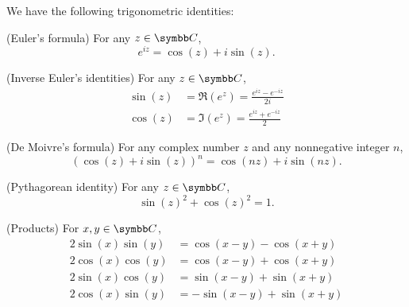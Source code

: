 \begin{proposition}\label{thm:trigonometric_identities}
  We have the following trigonometric identities:
  \begin{propenum}
     (Euler's formula) For any \( z \in \BC \),
    \begin{equation}\label{thm:trigonometric_identities/euler/identity}
      e^{iz} = \cos(z) + i \sin(z).
    \end{equation}

     (Inverse Euler's identities) For any \( z \in \BC \),
    \begin{align}
       \sin(z) &= \Re(e^z) = \frac {e^{iz} - e^{-iz}} {2i} \label{thm:trigonometric_identities/inverse_euler/sin} \\
       \cos(z) &= \Im(e^z) = \frac {e^{iz} + e^{-iz}} 2 \label{thm:trigonometric_identities/inverse_euler/cos}
    \end{align}

     (De Moivre's formula) For any complex number \( z \) and any nonnegative integer \( n \),
    \begin{equation}\label{thm:trigonometric_identities/de_moivre/identity}
      (\cos(z) + i \sin(z))^n = \cos(nz) + i \sin(nz).
    \end{equation}

     (Pythagorean identity) For any \( z \in \BC \),
    \begin{equation}\label{thm:trigonometric_identities/pythagorean/identity}
      \sin(z)^2 + \cos(z)^2 = 1.
    \end{equation}

     (Products) For \( x, y \in \BC \),
    \begin{align}
      2 \sin(x) \sin(y) &= \cos(x - y) - \cos(x + y) \label{thm:trigonometric_identities/products/ss} \\
      2 \cos(x) \cos(y) &= \cos(x - y) + \cos(x + y) \label{thm:trigonometric_identities/products/cc} \\
      2 \sin(x) \cos(y) &= \sin(x - y) + \sin(x + y) \label{thm:trigonometric_identities/products/sc} \\
      2 \cos(x) \sin(y) &= -\sin(x - y) + \sin(x + y) \label{thm:trigonometric_identities/products/cs}
    \end{align}


\end{propenum}
\end{proposition}
